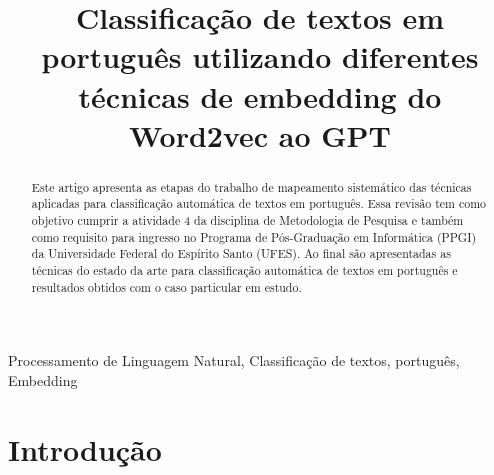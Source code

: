 \documentclass[conference]{IEEEtran}
\begin{document}
\title{Classificação de textos em português utilizando diferentes técnicas de embedding do Word2vec ao GPT\\
}

\author{
\and
{}
}

\maketitle

\begin{abstract}
  Este artigo apresenta as etapas do trabalho de mapeamento sistemático das técnicas aplicadas para classificação automática de textos em português. Essa revisão tem como objetivo cumprir a atividade 4 da disciplina de Metodologia de Pesquisa e também como requisito para ingresso no Programa de Pós-Graduação em Informática (PPGI) da Universidade Federal do Espírito Santo (UFES). Ao final são apresentadas as técnicas do estado da arte para classificação automática de textos em português e resultados obtidos com o caso particular em estudo.
\end{abstract}

\begin{IEEEkeywords}
Processamento de Linguagem Natural, Classificação de textos, português, Embedding
\end{IEEEkeywords}

\section{Introdução}
\end{document}
